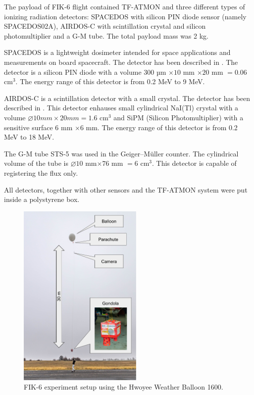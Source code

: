 \documentclass{Rpd}
\begin{document}
The payload of FIK-6 flight contained TF-ATMON and three different types of ionizing radiation detectors: SPACEDOS with silicon PIN diode sensor (namely SPACEDOS02A), AIRDOS-C with scintillation crystal and silicon photomultiplier and a G-M tube. The total payload mass was 2 kg.

SPACEDOS is a lightweight dosimeter intended for space applications and measurements on board spacecraft. The detector has been described in \cite{SPACEDOS}. The detector is a silicon PIN diode with a volume $300$ µm $\times 10$ mm $\times 20$ mm $= 0.06$ cm$^3$. The energy range of this detector is from 0.2 MeV to 9 MeV.

AIRDOS-C is a scintillation detector with a small crystal. The detector has been described in \cite{AIRDOS-C}. This detector enhauses small cylindrical NaI(Tl) crystal with a volume $\diameter 10 mm \times 20 mm = 1.6$ cm$^3$ and SiPM (Silicon Photomultiplier) with a sensitive surface $6$ mm $\times 6$ mm. The energy range of this detector is from 0.2 MeV to 18 MeV.

The G-M tube STS-5 was used in the Geiger–Müller counter. The cylindrical volume of the tube is $\diameter 10$ mm$ \times 76$ mm $= 6$ cm$^3$. This detector is capable of registering the flux only. 

All detectors, together with other sensors and the TF-ATMON system were put inside a polystyrene box. 

\begin{center}
\begin{figure}%
	\centerline{\includegraphics[width=60mm]{img/FIK-6_experiment_setup.png}}
	\caption{FIK-6 experiment setup using the Hwoyee Weather Balloon 1600. \label{FIK-6_setup}}
\end{figure}
\end{center}
\end{document}

